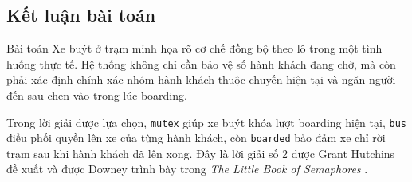 \subsection{Kết luận bài toán}

Bài toán Xe buýt ở trạm minh họa rõ cơ chế đồng bộ theo lô trong một
tình huống thực tế. Hệ thống không chỉ cần bảo vệ số hành khách đang
chờ, mà còn phải xác định chính xác nhóm hành khách thuộc chuyến hiện
tại và ngăn người đến sau chen vào trong lúc boarding.

Trong lời giải được lựa chọn, \texttt{mutex} giúp xe buýt khóa lượt
boarding hiện tại, \texttt{bus} điều phối quyền lên xe của từng hành
khách, còn \texttt{boarded} bảo đảm xe chỉ rời trạm sau khi hành khách
đã lên xong. Đây là lời giải số 2 được Grant Hutchins đề xuất và được
Downey trình bày trong \textit{The Little Book of Semaphores}
\cite[Sec.~7.4.3, p.~217]{downey2016}.
